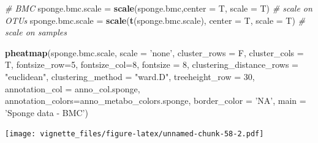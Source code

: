\documentclass[]{book}
\newenvironment{Shaded}{\begin{snugshade}}{\end{snugshade}}
\newcommand{\KeywordTok}[1]{\textcolor[rgb]{0.13,0.29,0.53}{\textbf{#1}}}
\newcommand{\DataTypeTok}[1]{\textcolor[rgb]{0.13,0.29,0.53}{#1}}
\newcommand{\DecValTok}[1]{\textcolor[rgb]{0.00,0.00,0.81}{#1}}
\newcommand{\StringTok}[1]{\textcolor[rgb]{0.31,0.60,0.02}{#1}}
\newcommand{\CommentTok}[1]{\textcolor[rgb]{0.56,0.35,0.01}{\textit{#1}}}
\newcommand{\NormalTok}[1]{#1}
\begin{document}
\begin{Shaded}
\begin{Highlighting}[]
\CommentTok{# BMC }
\NormalTok{sponge.bmc.scale =}\StringTok{ }\KeywordTok{scale}\NormalTok{(sponge.bmc,}\DataTypeTok{center =}\NormalTok{ T, }\DataTypeTok{scale =}\NormalTok{ T) }\CommentTok{# scale on OTUs}
\NormalTok{sponge.bmc.scale =}\StringTok{ }\KeywordTok{scale}\NormalTok{(}\KeywordTok{t}\NormalTok{(sponge.bmc.scale), }\DataTypeTok{center =}\NormalTok{ T, }\DataTypeTok{scale =}\NormalTok{ T) }\CommentTok{# scale on samples}

\KeywordTok{pheatmap}\NormalTok{(sponge.bmc.scale, }
         \DataTypeTok{scale =} \StringTok{'none'}\NormalTok{, }
         \DataTypeTok{cluster_rows =}\NormalTok{ F, }
         \DataTypeTok{cluster_cols =}\NormalTok{ T, }
         \DataTypeTok{fontsize_row=}\DecValTok{5}\NormalTok{, }\DataTypeTok{fontsize_col=}\DecValTok{8}\NormalTok{,}
         \DataTypeTok{fontsize =} \DecValTok{8}\NormalTok{,}
         \DataTypeTok{clustering_distance_rows =} \StringTok{"euclidean"}\NormalTok{,}
         \DataTypeTok{clustering_method =} \StringTok{"ward.D"}\NormalTok{,}
         \DataTypeTok{treeheight_row =} \DecValTok{30}\NormalTok{,}
         \DataTypeTok{annotation_col =}\NormalTok{ anno_col.sponge,}
         \DataTypeTok{annotation_colors=}\NormalTok{anno_metabo_colors.sponge,}
         \DataTypeTok{border_color =} \StringTok{'NA'}\NormalTok{,}
         \DataTypeTok{main =} \StringTok{'Sponge data - BMC'}\NormalTok{)}
\end{Highlighting}
\end{Shaded}

\texttt{[image: vignette\_files/figure-latex/unnamed-chunk-58-2.pdf]}
\end{document}
